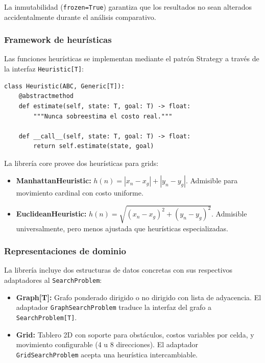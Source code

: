 La inmutabilidad (\texttt{frozen=True}) garantiza que los resultados no sean alterados accidentalmente durante el análisis comparativo.

\subsubsection{Framework de heurísticas}

Las funciones heurísticas se implementan mediante el patrón Strategy a través de la interfaz \texttt{Heuristic[T]}:

\begin{lstlisting}[caption={Patrón Strategy para heurísticas intercambiables}, label={lst:heuristic_iface}]
class Heuristic(ABC, Generic[T]):
    @abstractmethod
    def estimate(self, state: T, goal: T) -> float:
        """Nunca sobreestima el costo real."""

    def __call__(self, state: T, goal: T) -> float:
        return self.estimate(state, goal)
\end{lstlisting}

La librería core provee dos heurísticas para grids:
\begin{itemize}
    \item \textbf{ManhattanHeuristic:} $h(n) = |x_n - x_g| + |y_n - y_g|$. Admisible para movimiento cardinal con costo uniforme.
    \item \textbf{EuclideanHeuristic:} $h(n) = \sqrt{(x_n - x_g)^2 + (y_n - y_g)^2}$. Admisible universalmente, pero menos ajustada que heurísticas especializadas.
\end{itemize}

\subsubsection{Representaciones de dominio}

La librería incluye dos estructuras de datos concretas con sus respectivos adaptadores al \texttt{SearchProblem}:

\begin{itemize}
    \item \textbf{Graph[T]:} Grafo ponderado dirigido o no dirigido con lista de adyacencia. El adaptador \texttt{GraphSearchProblem} traduce la interfaz del grafo a \texttt{SearchProblem[T]}.

    \item \textbf{Grid:} Tablero 2D con soporte para obstáculos, costos variables por celda, y movimiento configurable (4 u 8 direcciones). El adaptador \texttt{GridSearchProblem} acepta una heurística intercambiable.
\end{itemize}


